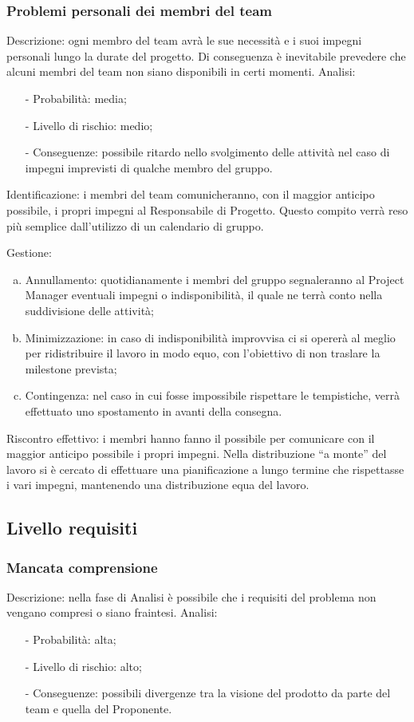 \documentclass[../analisi_dei_rischi.tex]{subfiles}
\begin{document}
\subsubsection{Problemi personali dei membri del team}
	Descrizione: ogni membro del team avrà le sue necessità e i suoi impegni personali lungo la durate del progetto. Di conseguenza è inevitabile prevedere che alcuni membri del team non siano disponibili in certi momenti. 
	Analisi:
	\begin{itemize}
		\item[-] Probabilità: media;
		\item[-] Livello di rischio: medio;
		\item[-] Conseguenze: possibile ritardo nello svolgimento delle attività nel caso di impegni imprevisti di qualche membro del gruppo.
	\end{itemize}	
		
	Identificazione: i membri del team comunicheranno, con il maggior anticipo possibile, i propri impegni al Responsabile di Progetto. Questo compito verrà reso più semplice dall’utilizzo di un calendario di gruppo. 
	
	Gestione:
	\begin{enumerate}[(a)]
		\item Annullamento: quotidianamente i membri del gruppo segnaleranno al Project Manager eventuali impegni o indisponibilità, il quale ne terrà conto nella suddivisione delle attività;
		\item Minimizzazione: in caso di indisponibilità improvvisa ci si opererà al meglio per ridistribuire il lavoro in modo equo, con l’obiettivo di non traslare la milestone prevista;
		\item  Contingenza: nel caso in cui fosse impossibile rispettare le tempistiche, verrà effettuato uno spostamento in avanti della consegna.
	\end{enumerate}		
	Riscontro effettivo: i membri hanno fanno il possibile per comunicare con il maggior anticipo possibile i propri impegni. Nella distribuzione “a monte” del lavoro si è cercato di effettuare una pianificazione a lungo termine che rispettasse i vari impegni, mantenendo una distribuzione equa del lavoro.


\subsection{Livello requisiti}

\subsubsection{Mancata comprensione}
	Descrizione: nella fase di Analisi è possibile che i requisiti del problema non vengano compresi o siano fraintesi.
	Analisi:
	\begin{itemize}
		\item[-] Probabilità: alta;
		\item[-] Livello di rischio: alto;
		\item[-] Conseguenze: possibili divergenze tra la visione del prodotto da parte del team e quella del Proponente.
	\end{itemize}	
		
\end{document}
